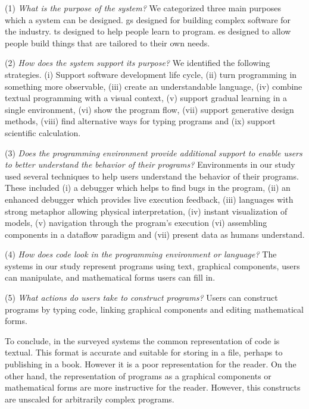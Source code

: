 (1) \textit{What is the purpose of the system?} We categorized three main purposes which a system can be designed. \ac{gs} designed for building complex software for the industry. \ac{ts} designed to help people learn to program. \ac{es} designed to allow people build things that are tailored to their own needs.

(2) \textit{How does the system support its purpose?} We identified the following strategies. (i) Support software development life cycle, (ii) turn programming in something more observable, (iii) create an understandable language, (iv) combine textual programming with a visual context, (v) support gradual learning in a single environment, (vi) show the program flow, (vii) support generative design methods, (viii) find alternative ways for typing programs and (ix) support scientific calculation.

(3) \textit{Does the programming environment provide additional support to enable users to better understand the behavior of their programs?} Environments in our study used several techniques to help users understand the behavior of their programs. These included (i) a debugger which helps to find bugs in the program, (ii) an enhanced debugger which provides live execution feedback, (iii) languages with strong metaphor allowing physical interpretation, (iv) instant visualization of models, (v) navigation through the program's execution (vi) assembling components in a dataflow paradigm and (vii) present data as humans understand.

(4) \textit{How does code look in the programming environment or language?} The systems in our study represent programs using text, graphical components, users can manipulate, and mathematical forms users can fill in.

(5) \textit{What actions do users take to construct programs?} Users can construct programs by typing code, linking graphical components and editing mathematical forms.

To conclude, in the surveyed systems the common representation of code is textual. This format is accurate and suitable for storing in a file, perhaps to publishing in a book. However it is a poor representation for the reader. On the other hand, the representation of programs as a graphical components or mathematical forms are more instructive for the reader. However, this constructs are unscaled for arbitrarily complex programs.